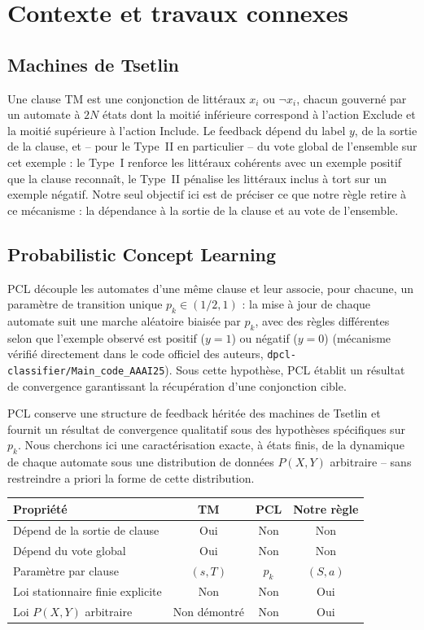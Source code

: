 \documentclass[12pt,a4paper]{article}
\begin{document}
\section{Contexte et travaux connexes}

\subsection{Machines de Tsetlin}

Une clause TM est une conjonction de littéraux $x_i$ ou $\neg x_i$,
chacun gouverné par un automate à $2N$ états dont la moitié inférieure
correspond à l'action Exclude et la moitié supérieure à l'action Include.
Le feedback dépend du label $y$, de la sortie de la clause, et -- pour le
Type~II en particulier -- du vote global de l'ensemble sur cet exemple :
le Type~I renforce les littéraux cohérents avec un exemple positif que la
clause reconnaît, le Type~II pénalise les littéraux inclus à tort sur un
exemple négatif. Notre seul objectif ici est de préciser ce que notre règle
retire à ce mécanisme : la dépendance à la sortie de la clause et au vote de
l'ensemble.

\subsection{Probabilistic Concept Learning}

PCL découple les automates d'une même clause et leur associe, pour chacune,
un paramètre de transition unique $p_k\in(1/2,1)$ : la mise à jour de
chaque automate suit une marche aléatoire biaisée par $p_k$, avec des
règles différentes selon que l'exemple observé est positif ($y=1$) ou
négatif ($y=0$) (mécanisme vérifié directement dans le code officiel des
auteurs, \texttt{dpcl-classifier/Main\_code\_AAAI25}). Sous cette hypothèse,
PCL établit un résultat de convergence garantissant la récupération d'une
conjonction cible.

PCL conserve une structure de feedback héritée des machines de Tsetlin et
fournit un résultat de convergence qualitatif sous des hypothèses
spécifiques sur $p_k$. Nous cherchons ici une caractérisation exacte, à
états finis, de la dynamique de chaque automate sous une distribution de
données $P(X,Y)$ arbitraire -- sans restreindre a priori la forme de cette
distribution.

\begin{center}
\begin{tabular}{lccc}
\toprule
Propriété & TM & PCL & Notre règle \\
\midrule
Dépend de la sortie de clause & Oui & Non & Non \\
Dépend du vote global & Oui & Non & Non \\
Paramètre par clause & $(s,T)$ & $p_k$ & $(S,a)$ \\
Loi stationnaire finie explicite & Non & Non & Oui \\
Loi $P(X,Y)$ arbitraire & Non démontré & Non & Oui \\
\bottomrule
\end{tabular}
\end{center}
\end{document}
